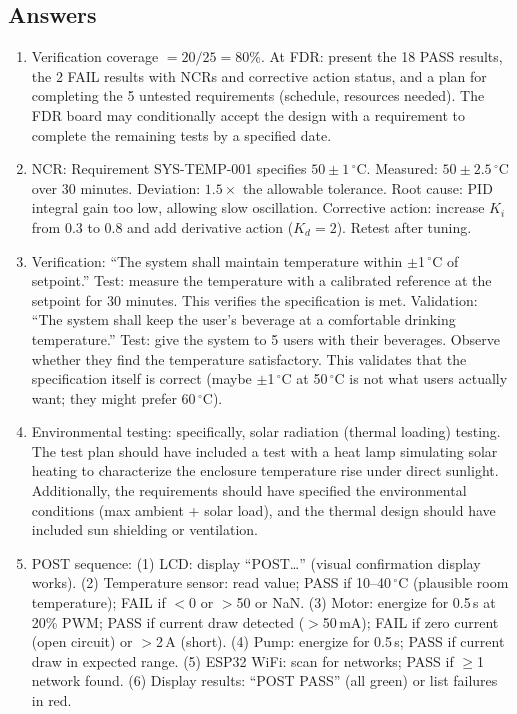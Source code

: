 \documentclass[11pt,letterpaper,twoside,openany]{book}
\newcommand{\degC}{\ensuremath{{}^{\circ}\text{C}}}
\begin{document}
\subsection{Answers}
\begin{enumerate}[leftmargin=1.5em]
\item Verification coverage $= 20/25 = 80\%$. At FDR: present the 18 PASS results, the 2 FAIL results with NCRs and corrective action status, and a plan for completing the 5 untested requirements (schedule, resources needed). The FDR board may conditionally accept the design with a requirement to complete the remaining tests by a specified date.
\item NCR: Requirement SYS-TEMP-001 specifies $50 \pm 1$\,\degC{}. Measured: $50 \pm 2.5$\,\degC{} over 30 minutes. Deviation: $1.5\times$ the allowable tolerance. Root cause: PID integral gain too low, allowing slow oscillation. Corrective action: increase $K_i$ from 0.3 to 0.8 and add derivative action ($K_d = 2$). Retest after tuning.
\item Verification: ``The system shall maintain temperature within $\pm$1\,\degC{} of setpoint.'' Test: measure the temperature with a calibrated reference at the setpoint for 30 minutes. This verifies the specification is met. Validation: ``The system shall keep the user's beverage at a comfortable drinking temperature.'' Test: give the system to 5 users with their beverages. Observe whether they find the temperature satisfactory. This validates that the specification itself is correct (maybe $\pm$1\,\degC{} at 50\,\degC{} is not what users actually want; they might prefer 60\,\degC{}).
\item Environmental testing: specifically, solar radiation (thermal loading) testing. The test plan should have included a test with a heat lamp simulating solar heating to characterize the enclosure temperature rise under direct sunlight. Additionally, the requirements should have specified the environmental conditions (max ambient + solar load), and the thermal design should have included sun shielding or ventilation.
\item POST sequence: (1) LCD: display ``POST\ldots'' (visual confirmation display works). (2) Temperature sensor: read value; PASS if 10--40\,\degC{} (plausible room temperature); FAIL if $<$0 or $>$50 or NaN. (3) Motor: energize for 0.5\,s at 20\% PWM; PASS if current draw detected ($>$50\,mA); FAIL if zero current (open circuit) or $>$2\,A (short). (4) Pump: energize for 0.5\,s; PASS if current draw in expected range. (5) ESP32 WiFi: scan for networks; PASS if $\geq$1 network found. (6) Display results: ``POST PASS'' (all green) or list failures in red.
\end{enumerate}
\end{document}

